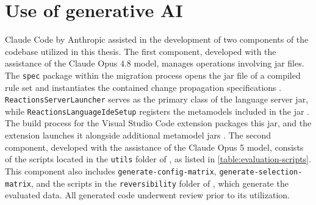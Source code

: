\chapter*{Use of generative AI}
\label{ch:UseOfGenerativeAI}

Claude Code by Anthropic assisted in the development of two components of the codebase utilized in this thesis.
The first component, developed with the assistance of the Claude Opus 4.8 model, manages operations involving jar files.
The \texttt{spec} package within the migration process opens the jar file of a compiled rule set and instantiates the contained change propagation specifications \cite{vitruv-dsls-spec-package}.
\texttt{ReactionsServerLauncher} serves as the primary class of the language server jar, while \texttt{ReactionsLanguageIdeSetup} registers the metamodels included in the jar \cite{vitruv-dsls-ide-package}.
The build process for the Visual Studio Code extension packages this jar, and the extension launches it alongside additional metamodel jars \cite{vitruv-dsls-vscode-plugin}.
The second component, developed with the assistance of the Claude Opus 5 model, consists of the scripts located in the \texttt{utils} folder of \cite{thesis-repo}, as listed in \autoref{table:evaluation-scripts}.
This component also includes \texttt{generate-config-matrix}, \texttt{generate-selection-matrix}, and the scripts in the \texttt{reversibility} folder of \cite{vitruv-dsls-fork}, which generate the evaluated data.
All generated code underwent review prior to its utilization.
